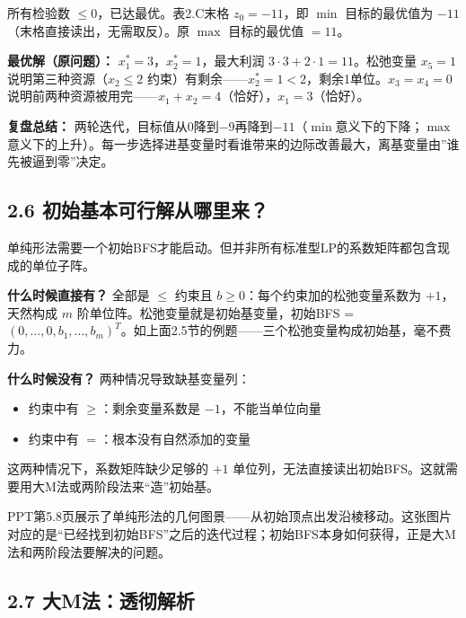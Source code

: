 {所有检验数 $\le 0$，已达最优。表2.C末格 $z_0=-11$，即 $\min$ 目标的最优值为 $-11$（末格直接读出，无需取反）。原 $\max$ 目标的最优值 $=11$。

\textbf{最优解（原问题）：} $x_1^*=3$，$x_2^*=1$，最大利润 $3\cdot 3 + 2\cdot 1 = 11$。松弛变量 $x_5=1$ 说明第三种资源（$x_2\le 2$ 约束）有剩余——$x_2^*=1<2$，剩余1单位。$x_3=x_4=0$ 说明前两种资源被用完——$x_1+x_2=4$（恰好），$x_1=3$（恰好）。

\textbf{复盘总结：} 两轮迭代，目标值从0降到$-9$再降到$-11$（$\min$意义下的下降；$\max$意义下的上升）。每一步选择进基变量时看谁带来的边际改善最大，离基变量由”谁先被逼到零”决定。}

\subsection{2.6 初始基本可行解从哪里来？}

单纯形法需要一个初始BFS才能启动。但并非所有标准型LP的系数矩阵都包含现成的单位子阵。

\textbf{什么时候直接有？} 全部是 $\le$ 约束且 $b\ge 0$：每个约束加的松弛变量系数为 $+1$，天然构成 $m$ 阶单位阵。松弛变量就是初始基变量，初始BFS = $(0,\dots,0,b_1,\dots,b_m)^T$。如上面2.5节的例题——三个松弛变量构成初始基，毫不费力。

\textbf{什么时候没有？} 两种情况导致缺基变量列：
\begin{itemize}
  \item 约束中有 $\ge$：剩余变量系数是 $-1$，不能当单位向量
  \item 约束中有 $=$：根本没有自然添加的变量
\end{itemize}
这两种情况下，系数矩阵缺少足够的 $+1$ 单位列，无法直接读出初始BFS。这就需要用大M法或两阶段法来“造”初始基。

PPT第5.8页展示了单纯形法的几何图景——从初始顶点出发沿棱移动。这张图片对应的是“已经找到初始BFS”之后的迭代过程；初始BFS本身如何获得，正是大M法和两阶段法要解决的问题。

\medskip
{}
\medskip

\subsection{2.7 大M法：透彻解析}

